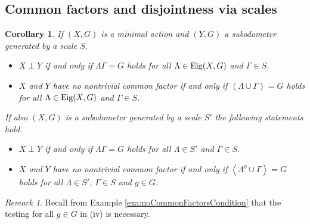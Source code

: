 \documentclass[12pt, reqno]{amsart}
\newtheorem{corollary}[theorem]{Corollary}
\theoremstyle{definition}
\theoremstyle{remark}
\newtheorem{remark}[theorem]{Remark}
\numberwithin{equation}{section}
\theoremstyle{theorem}
\theoremstyle{remark}
\newcommand{\grouphull}[1]{\left\langle #1 \right\rangle}
\def\Eig{{\rm Eig}}
\begin{document}
\subsection{Common factors and disjointness via scales}
\label{subsec:DisjointnessOfSubodometers_CommonFactorsAndDisjointnessViaScales}

\begin{corollary}
\label{cor:disjointnessAndScales}
    If $(X,G)$ is a minimal action and $(Y,G)$ a subodometer generated by a scale $S$. 
    \begin{itemize}
        \item[(i)]
        $X\perp Y$ if and only if $\Lambda\Gamma=G$ holds for all $\Lambda\in \Eig(X,G)$ and $\Gamma\in S$.
        \item[(ii)] 
        $X$ and $Y$ have no nontrivial common factor if and only if 
        $\grouphull{\Lambda\cup\Gamma}=G$ holds for all $\Lambda\in \Eig(X,G)$ and $\Gamma\in S$.
    \end{itemize}
    If also $(X,G)$ is a subodometer generated by a scale $S'$ the following statements hold. 
    \begin{itemize}
        \item[(iii)] $X\perp Y$ if and only if $\Lambda\Gamma=G$ holds for all $\Lambda\in S'$ and $\Gamma\in S$. 
        \item[(iv)]
        $X$ and $Y$ have no nontrivial common factor if and only if 
        $\grouphull{\Lambda^g\cup\Gamma}=G$ holds for all $\Lambda\in S'$, $\Gamma\in S$ and $g\in G$.
    \end{itemize}
\end{corollary}

\begin{remark}
    Recall from Example \ref{exa:noCommonFactorsCondition} that the testing for all $g\in G$ in (iv) is necessary. 
\end{remark}
\end{document}
